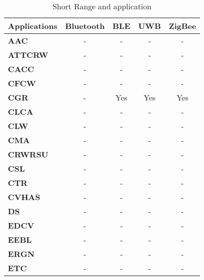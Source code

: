 \FloatBarrier
\begin{table}[ht!]
\centering
\caption{Short Range and application }
    \label{fig:techandappshort}
\begin{tabular}{lcccc}
\hline
\textbf{Applications}  & \textbf{Bluetooth} & \textbf{BLE} & \textbf{UWB} & \textbf{ZigBee} \\
\hline
\textbf{AAC}           & -                  & -            & -            & -               \\
\textbf{ATTCRW}        & -                  & -            & -            & -               \\
\textbf{CACC}          & -                  & -            & -            & -               \\
\textbf{CFCW}          & -                  & -            & -            & -               \\
\textbf{CGR}           & -                  & Yes          & Yes          & Yes             \\
\textbf{CLCA}          & -                  & -            & -            & -               \\
\textbf{CLW}           & -                  & -            & -            & -               \\
\textbf{CMA}           & -                  & -            & -            & -               \\
\textbf{CRWRSU}        & -                  & -            & -            & -               \\
\textbf{CSL}           & -                  & -            & -            & -               \\
\textbf{CTR}           & -                  & -            & -            & -               \\
\textbf{CVHAS}         & -                  & -            & -            & -               \\
\textbf{DS}            & -                  & -            & -            & -               \\
\textbf{EDCV}          & -                  & -            & -            & -               \\
\textbf{EEBL}          & -                  & -            & -            & -               \\
\textbf{ERGN}          & -                  & -            & -            & -               \\
\textbf{ETC}           & -                  & -            & -            & -               \\

\end{tabular}
\end{table}
